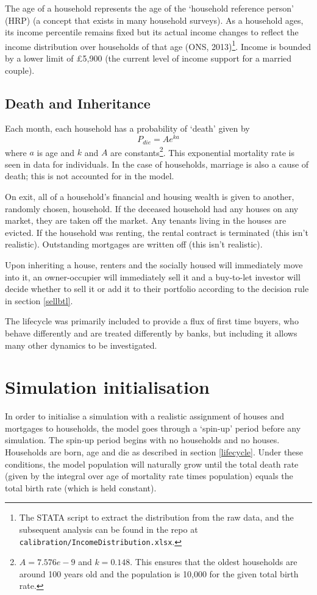 \documentclass{report}
\begin{document}
The age of a household represents the age of the `household reference person' (HRP) (a concept that exists in many household surveys). As a household ages, its income percentile remains fixed but its actual income changes to reflect the income distribution over households of that age (ONS, 2013)\footnote{The STATA script to extract the distribution from the raw data, and the subsequent analysis can be found in the repo at \texttt{calibration/IncomeDistribution.xlsx}.}. Income is bounded by a lower limit of \pounds 5,900 (the current level of income support for a married couple).

\subsection{Death and Inheritance}
Each month, each household has a probability of `death' given by
\begin{equation}
P_{die} = Ae^{ka}
\label{mortality}
\end{equation}
where $a$ is age and $k$ and $A$ are constants\footnote{$A=7.576e-9$ and $k=0.148$. This ensures that the oldest households are around 100 years old and the population is 10,000 for the given total birth rate.}. This exponential mortality rate is seen in data for individuals. In the case of households, marriage is also a cause of death; this is not accounted for in the model.

On exit, all of a household's financial and housing wealth is given to another, randomly chosen, household. If the deceased household had any houses on any market, they are taken off the market. Any tenants living in the houses are evicted. If the household was renting, the rental contract is terminated (this isn't realistic). Outstanding mortgages are written off (this isn't realistic).

Upon inheriting a house, renters and the socially housed will immediately move into it, an owner-occupier will immediately sell it and a buy-to-let investor will decide whether to sell it or add it to their portfolio according to the decision rule in section \ref{sellbtl}.

The lifecycle was primarily included to provide a flux of first time buyers, who behave differently and are treated differently by banks, but including it allows many other dynamics to be investigated.
 
\section{Simulation initialisation}
In order to initialise a simulation with a realistic assignment of houses and mortgages to households, the model goes through a `spin-up' period before any simulation. The spin-up period begins with no households and no houses. Households are born, age and die as described in section \ref{lifecycle}. Under these conditions, the model population will naturally grow until the total death rate (given by the integral over age of mortality rate times population) equals the total birth rate (which is held constant).
\end{document}
